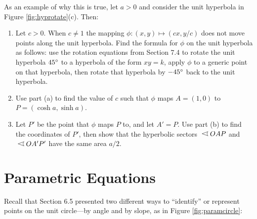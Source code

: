 {\begin{enumerate}[\bfseries 1.]
\noindent As an example of why this is true, let $a>0$ and consider the unit
hyperbola in Figure \ref{fig:hyprotate}(c). Then:
 \begin{enumerate}[\bfseries (a)]
  \item Let $c>0$. When $c \ne 1$ the mapping $\phi: (x,y) \mapsto (cx,y/c)$
   does not move points along the unit hyperbola. Find the formula for $\phi$ on
   the unit hyperbola as follows:
   use the rotation equations from Section 7.4 to rotate the
   unit hyperbola $45^\circ$ to a hyperbola of the form $xy=k$, apply
   $\phi$ to a generic point on that hyperbola, then rotate that
   hyperbola by $-45^\circ$ back to the unit hyperbola.
  \item Use part (a) to find the value of $c$ such that $\phi$ maps
   $A=(1,0)$ to $P=(\cosh a,\sinh a)$.
  \item Let $P'$ be the point that $\phi$ maps $P$ to, and let $A'=P$. Use part
   (b) to find the coordinates of $P'$, then show that the hyperbolic sectors
   $\;\hypsector\;OAP$ and $\;\hypsector\;OA'P'$ have the same area $a/2$.
 \end{enumerate}
\end{enumerate}
}
\newpage
\section{Parametric Equations}
Recall that Section 6.5 presented two different ways to ``identify'' or
represent points on the unit circle---by angle and by slope, as in Figure
\ref{fig:paramcircle}:

